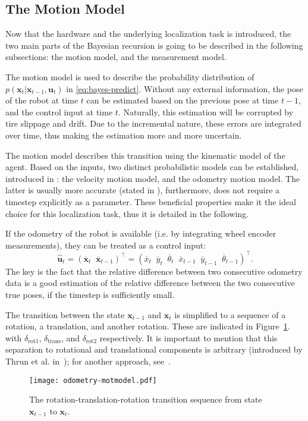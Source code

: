 \subsection{The Motion Model}\label{subsec:mot-model}
Now that the hardware and the underlying localization task is introduced, the two main parts of the
Bayesian recursion is going to be described in the following subsections: the motion model, and the measurement model.

The motion model is used to describe the probability distribution of
$p(\mathbf{x}_t | \mathbf{x}_{t-1},\mathbf{u}_t)$ in \eqref{eq:bayes-predict}. \linebreak
Without any external information, the pose of the robot at time $t$ can be estimated based on the previous pose
at time $t-1$, and the control input at time $t$. Naturally, this estimation will be corrupted by tire slippage and drift.
Due to the incremental nature, these errors are integrated over time, thus making the estimation more and more
uncertain.

The motion model describes this transition using the kinematic model of the agent.
Based on the inputs, two distinct probabilistic models can be established, introduced in \cite{Thrun2005}: the velocity motion model,
and the odometry motion model.
The latter is usually more accurate (stated in \cite{Thrun2005}),
furthermore, does not require a timestep explicitly as a parameter.
These beneficial properties make it the ideal choice for this localization task,
thus it is detailed in the following.

If the odometry of the robot is available (i.e. by integrating wheel encoder measurements),
they can be treated as a control input:
\begin{equation}\label{eq:odom-raw-input}
    \hat{\mathbf{u}}_t = (\overline{\mathbf{x}}_t\;\;\overline{\mathbf{x}}_{t-1})^\top =
    \left(\overline{x}_t\;\;\overline{y}_t\;\;\overline{\theta}_t\;\;\overline{x}_{t-1}\;\;\overline{y}_{t-1}\;\;\overline{\theta}_{t-1}\right)^\top.
\end{equation}
The key is the fact that the relative difference between
two consecutive odometry data is a good estimation of the relative difference between
the two consecutive true poses, if the timestep is sufficiently small.

The transition between the state $\mathbf{x}_{t-1}$ and $\mathbf{x}_{t}$ is simplified to a sequence of a rotation, a translation,
and another rotation.
These are indicated in Figure~\ref{fig:odom-mot-model}. with $\delta_{\mathrm{rot1}}$, $\delta_{\mathrm{trans}}$,
and $\delta_{\mathrm{rot2}}$ respectively.
It is important to mention that this separation to rotational and translational components is arbitrary
(introduced by Thrun et al. in~\cite{Thrun2005}); for another approach, see~\cite{Eliazar2004}.
\begin{figure}[htbp]
    \centering
    \texttt{[image: odometry-motmodel.pdf]}
    \caption{The rotation-translation-rotation transition sequence from state $\mathbf{x}_{t-1}$ to $\mathbf{x}_{t}$.}
    \label{fig:odom-mot-model}
\end{figure}

